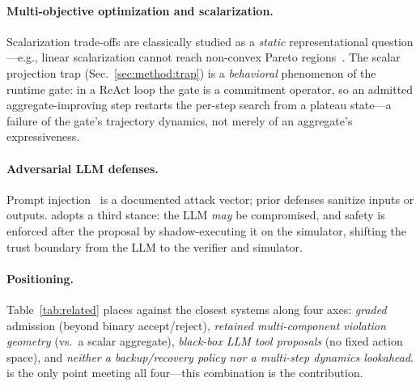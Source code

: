 \paragraph{Multi-objective optimization and scalarization.}
Scalarization trade-offs are classically studied as a \emph{static} representational question---e.g., linear scalarization cannot reach non-convex Pareto regions~\cite{miettinen1999nonlinear}. The scalar projection trap (Sec.~\ref{sec:method:trap}) is a \emph{behavioral} phenomenon of the runtime gate: in a ReAct loop the gate is a commitment operator, so an admitted aggregate-improving step restarts the per-step search from a plateau state---a failure of the gate's trajectory dynamics, not merely of an aggregate's expressiveness.

\paragraph{Adversarial LLM defenses.}
Prompt injection~\cite{greshake2023injection} is a documented attack vector; prior defenses sanitize inputs or outputs. \silr{} adopts a third stance: the LLM \emph{may} be compromised, and safety is enforced after the proposal by shadow-executing it on the simulator, shifting the trust boundary from the LLM to the verifier and simulator.

\paragraph{Positioning.}
Table~\ref{tab:related} places \silr{} against the closest systems along four axes: \emph{graded} admission (beyond binary accept/reject), \emph{retained multi-component violation geometry} (vs.\ a scalar aggregate), \emph{black-box LLM tool proposals} (no fixed action space), and \emph{neither a backup/recovery policy nor a multi-step dynamics lookahead}. \silr{} is the only point meeting all four---this combination is the contribution.

